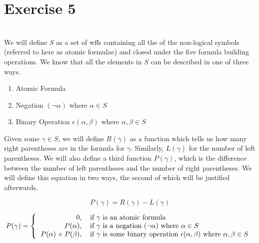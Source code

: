 \documentclass[12pt]{article}
\begin{document}
\newpage
\section*{Exercise 5}
\\

We will define $S$ as a set of wffs containing all the of the non-logical symbols (referred to here as atomic formulae) and closed under the five formula building operations. We know that all the elements in $S$ can be described in one of three ways. 

\begin{enumerate}
    \item Atomic Formula
    \item Negation $(\lnot \alpha)$ where $\alpha \in S$
    \item Binary Operation $\epsilon(\alpha, \beta)$ where $\alpha, \beta \in S$
\end{enumerate}

Given some $\gamma \in S$, we will define $R(\gamma)$ as a function which tells us how many right parentheses are in the formula for $\gamma$. Similarly, $L(\gamma)$ for the number of left parentheses. We will also define a third function $P(\gamma)$, which is the difference between the number of left parentheses and the number of right parentheses. We will define this equation in two ways, the second of which will be justified afterwards.

\begin{equation}
    P(\gamma) = R(\gamma) - L(\gamma)
\end{equation}

\begin{equation}\label{pdef}
    P(\gamma) = \left\{
        \begin{tabular}{r l}
             0, & if $\gamma$ is an atomic formula \\
             $P(\alpha)$, & if $\gamma$ is a negation $(\lnot \alpha)$ where $\alpha \in S$\\
             $P(\alpha) + P(\beta)$, & if $\gamma$ is some binary operation $\epsilon(\alpha, \beta)$ where $\alpha, \beta \in S$
        \end{tabular}
    \right.
\end{equation}
\\
\end{document}
